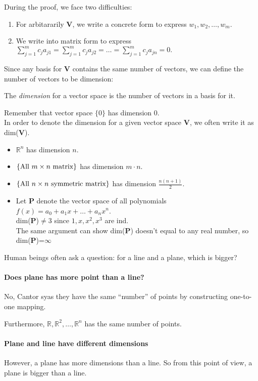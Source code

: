 During the proof, we face two difficulties:
\begin{enumerate}
\item
For arbitararily $\bm V$, we write a concrete form to express $w_1,w_2,\dots,w_m$.
\item
We write into matrix form to express $\sum_{j=1}^{m}c_ja_{j1} = \sum_{j=1}^{m}c_ja_{j2} = \dots = \sum_{j=1}^{m}c_ja_{jn} = 0.$
\end{enumerate}
Since any basis for $\bm V$ contains the same number of vectors, we can define the number of vectors to be dimension:
\begin{definition}[Dimension]
The \emph{dimension} for a vector space is the number of vectors in a basis for it.
\end{definition}
\begin{remark}
Remember that vector space $\{0\}$ has dimension $0$.\\In order to denote the dimension for a given vector space $\bm V$, we often write it as dim($\bm V$).
\end{remark}
\begin{example}
\begin{itemize}
\item
$\mathbb{R}^{n}$ has dimension $n$.
\item
$\{\text{All $m\times n$ matrix}\}$ has dimension $m\cdot n$.
\item
$\{\text{All $n\times n$ symmetric matrix}\}$ has dimension $\frac{n(n+1)}{2}$.
\item
Let $\bm P$ denote the vector space of all polynomials $f(x) = a_0+a_1x+\dots+a_nx^n$.\\
dim($\bm P$)$\ne 3$ since $1,x,x^2,x^3$ are ind.\\
The same argument can show dim($\bm P$) doesn't equal to any real number, so dim($\bm P$)=$\infty$
\end{itemize}
\end{example}
Human beings often ask a question: for a line and a plane, which is bigger?
\paragraph{Does plane has more point than a line?}
No, Cantor syas they have the same ``number'' of points by constructing one-to-one mapping.

Furthermore, $\mathbb{R},\mathbb{R}^2,\dots,\mathbb{R}^n$ has the same number of points.
\paragraph{Plane and line have different dimensions}
However, a plane has more dimensions than a line. So from this point of view, a plane is bigger than a line.


